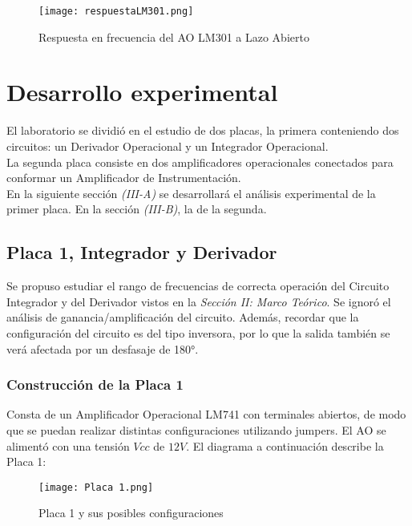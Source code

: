 \documentclass[letterpaper, 10 pt, conference]{ieeeconf}  %
\begin{document}
\begin{figure}[H]
  \centering
  \texttt{[image: respuestaLM301.png]}
  \caption{Respuesta en frecuencia del AO LM301 a Lazo Abierto}
  \label{fig:lm301freq}
\end{figure}

\section{Desarrollo experimental}
El laboratorio se dividió en el estudio de dos placas, la primera conteniendo dos circuitos: un Derivador Operacional y un Integrador Operacional.\\
La segunda placa consiste en dos amplificadores operacionales conectados para conformar un Amplificador de Instrumentación.\\
En la siguiente sección \textit{(III-A)} se desarrollará el análisis experimental de la primer placa. En la sección \textit{(III-B)}, la de la segunda.

\subsection{Placa 1, Integrador y Derivador}
Se propuso estudiar el rango de frecuencias de correcta operación del Circuito Integrador y del Derivador vistos en la \textit{Sección II: Marco Teórico}. Se ignoró el análisis de ganancia/amplificación del circuito. Además, recordar que la configuración del circuito es del tipo inversora, por lo que la salida también se verá afectada por un desfasaje de 180°.

\subsubsection{Construcción de la Placa 1}
Consta de un Amplificador Operacional LM741 con terminales abiertos, de modo que se puedan realizar distintas configuraciones utilizando jumpers. El AO se alimentó con una tensión $Vcc$ de $12V$.
El diagrama a continuación describe la Placa 1:

\begin{figure}[H]
  \centering
  \texttt{[image: Placa 1.png]}
  \caption{Placa 1 y sus posibles configuraciones}
  \label{fig:placa1}
\end{figure}
\end{document}
